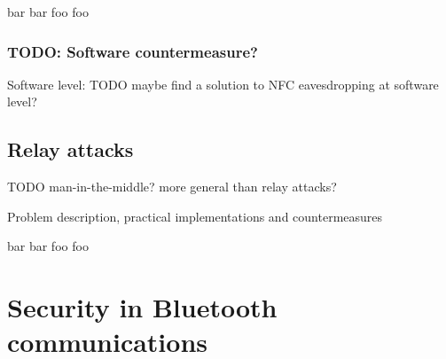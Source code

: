 \documentclass[12pt,a4paper]{article}
\begin{document}
bar bar foo foo

\subsubsection{TODO: Software countermeasure?}

Software level: TODO maybe find a solution to NFC eavesdropping at software level?


\subsection{Relay attacks}

TODO man-in-the-middle? more general than relay attacks?

Problem description, practical implementations and countermeasures \cite{DBLP:journals/compsec/HanckeMM09} \cite{DBLP:conf/rfidsec/FrancisHMM10} \cite{DBLP:conf/sec/RolandLS12}

bar bar foo foo

\section{Security in Bluetooth communications}
\end{document}
